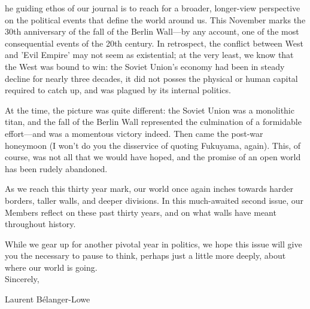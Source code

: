 

he guiding ethos of our journal is to reach for a broader, longer-view perspective on the political events that define the world around us. This November marks the 30th anniversary of the fall of the Berlin Wall---by any account, one of the most consequential events of the 20th century. In retrospect, the conflict between West and 'Evil Empire' may not seem as existential; at the very least, we know that the West was bound to win: the Soviet Union's economy had been in steady decline for nearly three decades, it did not posses the physical or human capital required to catch up, and was plagued by its internal politics.  

At the time, the picture was quite different: the Soviet Union was a monolithic titan, and the fall of the Berlin Wall represented the culmination of a formidable effort---and was a momentous victory indeed. Then came the post-war honeymoon (I won't do you the disservice of quoting Fukuyama, again). This, of course, was not all that we would have hoped, and the promise of an open world has been rudely abandoned. 

As we reach this thirty year mark, our world once again inches towards harder borders, taller walls, and deeper divisions. In this much-awaited second issue, our Members reflect on these past thirty years, and on what walls have meant throughout history. 

While we gear up for another pivotal year in politics, we hope this issue will give you the necessary to pause to think, perhaps just a little more deeply, about where our world is going. \\

Sincerely,

Laurent B\'elanger-Lowe